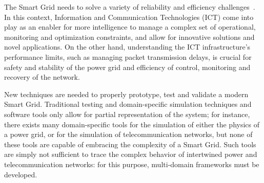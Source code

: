 \documentclass[conference]{IEEEtran}
\begin{document}
The Smart Grid needs to solve a variety of reliability and efficiency challenges~\cite{moslehiReliabilityPerspectiveSmart2010}. In this context, Information and Communication Technologies (ICT) come into play as an enabler for more intelligence to manage a complex set of operational, monitoring and optimization constraints, and allow for innovative solutions and novel applications.
On the other hand, understanding the ICT infrastructure's performance limits, such as managing packet transmission delays, is crucial for safety and stability of the power grid and efficiency of control, monitoring and recovery of the network.

New techniques are needed to properly prototype, test and validate a modern Smart Grid. Traditional testing and domain-specific simulation techniques and software tools only allow for partial representation of the system; for instance, there exists many domain-specific tools for the simulation of either the physics of a power grid, or for the simulation of telecommunication networks, but none of these tools are capable of embracing the complexity of a Smart Grid. Such tools are simply not sufficient to trace the complex behavior of intertwined power and telecommunication networks: for this purpose, multi-domain frameworks must be developed.

\end{document}
